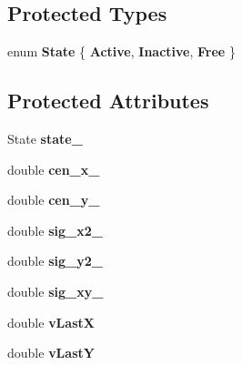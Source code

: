 \subsection*{Protected Types}
\begin{DoxyCompactItemize}
\item 
enum {\bfseries State} \{ {\bfseries Active}, 
{\bfseries Inactive}, 
{\bfseries Free}
 \}
\end{DoxyCompactItemize}
\subsection*{Protected Attributes}
\begin{DoxyCompactItemize}
\item 
\hypertarget{classBlobTracker_ad96c96edcf8e9b2155aba3c39d128249}{State {\bfseries state\-\_\-}}\label{classBlobTracker_ad96c96edcf8e9b2155aba3c39d128249}

\item 
\hypertarget{classBlobTracker_a93b360b9499b9a77c7da2eb0b264d8af}{double {\bfseries cen\-\_\-x\-\_\-}}\label{classBlobTracker_a93b360b9499b9a77c7da2eb0b264d8af}

\item 
\hypertarget{classBlobTracker_ab5eaa89cfedfb25fc0881009cefdbea4}{double {\bfseries cen\-\_\-y\-\_\-}}\label{classBlobTracker_ab5eaa89cfedfb25fc0881009cefdbea4}

\item 
\hypertarget{classBlobTracker_a90039cb4599ff8cf137d0b0a9b89801e}{double {\bfseries sig\-\_\-x2\-\_\-}}\label{classBlobTracker_a90039cb4599ff8cf137d0b0a9b89801e}

\item 
\hypertarget{classBlobTracker_a8fa7fa36db3faed93d94b30bd50449e1}{double {\bfseries sig\-\_\-y2\-\_\-}}\label{classBlobTracker_a8fa7fa36db3faed93d94b30bd50449e1}

\item 
\hypertarget{classBlobTracker_af7c64be12d9aeee877adc6027e57dc31}{double {\bfseries sig\-\_\-xy\-\_\-}}\label{classBlobTracker_af7c64be12d9aeee877adc6027e57dc31}

\item 
\hypertarget{classBlobTracker_a37789b44e5e478a237580a3e168bd496}{double {\bfseries v\-Last\-X}}\label{classBlobTracker_a37789b44e5e478a237580a3e168bd496}

\item 
\hypertarget{classBlobTracker_ae836b9dd8d830ba8f6ccb6ea2f80e313}{double {\bfseries v\-Last\-Y}}\label{classBlobTracker_ae836b9dd8d830ba8f6ccb6ea2f80e313}


\end{DoxyCompactItemize}
